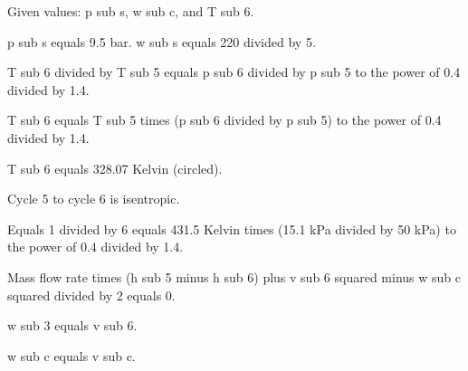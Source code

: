 Given values: p sub s, w sub c, and T sub 6.

p sub s equals 9.5 bar.
w sub s equals 220 divided by 5.

T sub 6 divided by T sub 5 equals p sub 6 divided by p sub 5 to the power of 0.4 divided by 1.4.

T sub 6 equals T sub 5 times (p sub 6 divided by p sub 5) to the power of 0.4 divided by 1.4.

T sub 6 equals 328.07 Kelvin (circled).

Cycle 5 to cycle 6 is isentropic.

Equals 1 divided by 6 equals 431.5 Kelvin times (15.1 kPa divided by 50 kPa) to the power of 0.4 divided by 1.4.

Mass flow rate times (h sub 5 minus h sub 6) plus v sub 6 squared minus w sub c squared divided by 2 equals 0.

w sub 3 equals v sub 6.

w sub c equals v sub c.
